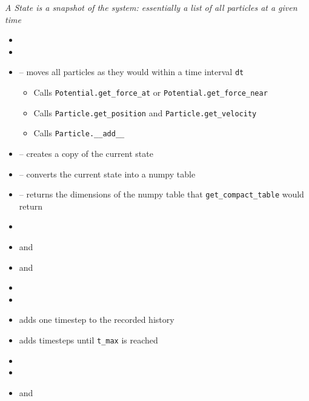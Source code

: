 \begin{frame}[fragile]
%
\begin{defbox}
\emph{\small A State is a snapshot of the system: essentially a list of all particles at a given time}
\begin{itemize}
\item {}
\item {}
\item {} -- moves all particles as they would within a time interval \texttt{dt}
	\begin{itemize}
	\item Calls \texttt{Potential.get\_force\_at} or \texttt{Potential.get\_force\_near}
	\item Calls \texttt{Particle.get\_position} and \texttt{Particle.get\_velocity} 
	\item Calls \texttt{Particle.\_\_add\_\_}
	\end{itemize}
\item {} -- creates a copy of the current state
\item {}  -- converts the current state into a numpy table
\item {}  -- returns the dimensions of the numpy table that \texttt{get\_compact\_table} would return
\end{itemize}
\end{defbox}
%
\end{frame}


\begin{frame}[fragile]
%
\begin{defbox}
\begin{itemize}
\item {}
\item {} and 
\item {} and 
\item {}
\item {}
\item {} adds one timestep to the recorded history
\item {} adds timesteps until \texttt{t\_max} is reached
\item {}
\item {}
\item {} and 
\end{itemize}
\end{defbox}
%
\end{frame}

